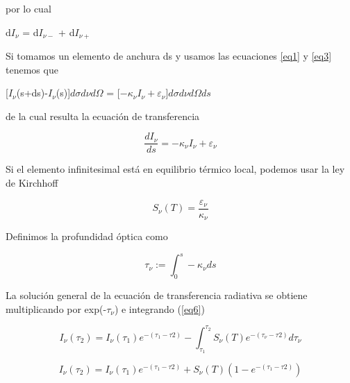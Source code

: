 \documentclass[a4paper]{article}
\begin{document}
por lo cual

\begin{center}
d$I_{\nu}$ = d$I_{\nu -}$ + d$I_{\nu +}$
\end{center}

Si tomamos un elemento de anchura ds y usamos las ecuaciones \ref{eq1} y \ref{eq3} tenemos que

\begin{center}
[$I_{\nu}$(s+ds)-$I_{\nu}$(s)]$d\sigma d\nu d\Omega$ = [$-\kappa_{\nu} I_{\nu} + \varepsilon_{\nu}$]$d\sigma d\nu d\Omega ds$
\end{center}

de la cual resulta la ecuación de transferencia

\begin{equation} \label{eq6}
\boxed{\frac{dI_{\nu}}{ds} = -\kappa_{\nu} I_{\nu} + \varepsilon_{\nu}}
\end{equation}

Si el elemento infinitesimal está en equilibrio térmico local, podemos usar la ley de Kirchhoff

\begin{equation} \label{eq7}
S_{\nu}(T) = \frac{\varepsilon_{\nu}}{\kappa_{\nu}}
\end{equation}

Definimos la profundidad óptica como

\begin{equation} \label{eq8}
\tau_{\nu} := \int_{0} ^{s} -\kappa_{\nu} ds
\end{equation}



La solución general de la ecuación de transferencia radiativa se obtiene multiplicando por exp(-$\tau_{\nu}$) e integrando (\ref{eq6})


\begin{equation} \label{eq10}
I_{\nu}(\tau_{2}) = I_{\nu}(\tau_{1}) e^{-(\tau_{1} - \tau{2})} - \int_{\tau_{1}}^{\tau_{2}} S_{\nu}(T) e^{-(\tau_{\nu} - \tau{2})} d\tau_{\nu}
\end{equation}

\begin{equation} \label{eq11}
I_{\nu}(\tau_{2}) = I_{\nu}(\tau_{1}) e^{-(\tau_{1} - \tau{2})} +  S_{\nu}(T)(1- e^{-(\tau_{1} - \tau{2})} )
\end{equation}
\end{document}

